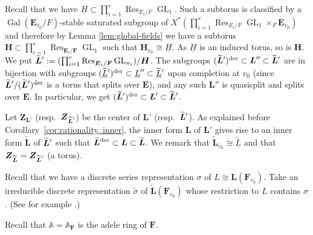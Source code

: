 \documentclass[a4paper]{amsart}
\numberwithin{equation}{section}
\theoremstyle{remark}
\theoremstyle{definition}
\DeclareMathOperator{\Res}{Res}
\DeclareMathOperator{\Gal}{Gal}
\DeclareMathOperator{\GL}{GL}
\newcommand{\alggrp}[1]{\underline{#1}}
\newcommand{\der}{\mathrm{der}}
\newcommand{\glob}[1]{\boldsymbol{#1}}
\renewcommand{\simeq}{\cong}
\newcommand{\lowprime}[1][\prime]{
  \mathchoice
    {\raisebox{-0.7ex}{$\scriptstyle #1$}}
    {\raisebox{-0.7ex}{$\scriptstyle #1$}}
    {\raisebox{-0.7ex}{$\scriptstyle #1$}}
    {\raisebox{-0.3ex}{$\scriptscriptstyle #1$}}
}
\begin{document}
Recall that we have $\alggrp{H}\subset \prod_{i = 1}^{r}\Res_{E_{i}/F}\GL_{1}$.
Such a subtorus is classified by a $\Gal(\glob{E}_{v_{0}}/F)$-stable saturated subgroup of $X^{*}(\prod_{i = 1}^{r}\Res_{E_{i}/F}\GL_{1} \times_{F} \glob{E}_{v_{0}})$ and therefore by Lemma \ref{lem:global-fields} we have a subtorus $\glob{H}\subset \prod_{i = 1}^{r}\Res_{\glob{E}_{i}/\glob{F}}\GL_{1}$ such that $\glob{H}_{v_{0}}\simeq \alggrp{H}$.
As $\alggrp{H}$ is an induced torus, so is $\glob{H}$.
We put $\widetilde{\glob{L}}^{\lowprime} := (\prod_{i = 1}^{r}\Res_{\glob{E}_{i}/\glob{F}}\GL_{n_{i}})/\glob{H}$.
The subgroups $(\widetilde{\glob{L}}^{\lowprime})^\der \subset \glob{L}'' \subset \widetilde{\glob{L}}^{\lowprime}$ are in bijection with subgroups $(\widetilde{\alggrp{L}}^{\lowprime})^\der \subset \alggrp{L}'' \subset \widetilde{\alggrp{L}}^{\lowprime}$ upon completion at $v_0$ (since $\widetilde{\glob{L}}^{\lowprime}/(\widetilde{\glob{L}}^{\lowprime})^\der$ is a torus that splits over $\glob{E}$), and any such $\glob{L}''$ is quasisplit and splits over $\glob{E}$.
In particular, we get $(\widetilde{\glob{L}}^{\lowprime})^\der \subset \glob{L}' \subset \widetilde{\glob{L}}^{\lowprime}$.

Let $\glob{Z}_{\glob{L}'}$ (resp.\ $\glob{Z}_{\widetilde{\glob{L}}^{\lowprime}}$) be the center of $\glob{L}'$ (resp.\ $\widetilde{\glob{L}}^{\lowprime}$).
As explained before Corollary~\ref{cor:rationality, inner}, the inner form $\glob{L}$ of $\glob{L}'$ gives rise to an inner form $\widetilde{\glob{L}}$ of $\widetilde{\glob{L}}^{\lowprime}$ such that $\widetilde{\glob{L}}^{\lowprime[\der]} \subset \glob{L} \subset \widetilde{\glob{L}}$.
We remark that $\widetilde{\glob{L}}_{v_0} \cong \widetilde{\alggrp L}$ and that $\glob{Z}_{\widetilde{\glob{L}}} = \glob{Z}_{\widetilde{\glob{L}}^{\lowprime}}$ (a torus).

Recall that we have a discrete series representation $\sigma$ of $L \simeq \glob{L}(\glob{F}_{v_{0}})$.
Take an irreducible discrete representation $\widetilde{\sigma}$ of $\widetilde{\glob{L}}(\glob{F}_{v_{0}})$ whose restriction to $L$ contains $\sigma$.
(See for example \cite[\S2]{MR1141803}.)

Recall that $\mathbb{A} = \mathbb{A}_{\glob{F}}$ is the adele ring of $\glob{F}$.
\end{document}
